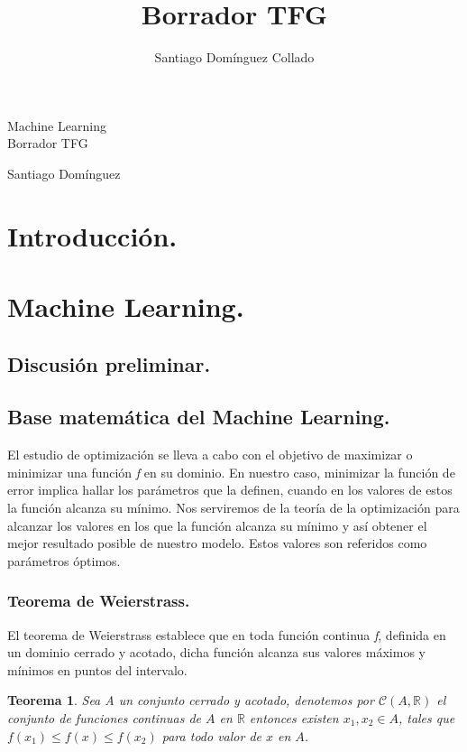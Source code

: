 \documentclass[a4paper,10pt]{article}
\author{Santiago Domínguez Collado}
\title{Borrador TFG}
\newtheorem{theorem}{Teorema}
\begin{document}
\begin{center}
\begin{LARGE}
Machine Learning \\
\vspace*{0.15in}
\UseRawInputEncoding
Borrador TFG
\end{LARGE}
\end{center}
\begin{center}
\begin{large}
Santiago Domínguez
\end{large}
\end{center}

\section{Introducción.}
\section{Machine Learning.}
\subsection{Discusión preliminar.}
\subsection{Base matemática del Machine Learning.}
\label{}

El estudio de optimización se lleva a cabo con el objetivo de maximizar o minimizar una función \textit{f} en su dominio.
En nuestro caso, minimizar la función de error implica hallar los parámetros que la definen, cuando en los valores de estos la función alcanza su mínimo.
Nos serviremos de la teoría de la optimización para alcanzar los valores en los que la función alcanza su mínimo y así obtener el mejor resultado posible de nuestro modelo. Estos valores son referidos como parámetros óptimos.
\subsubsection{Teorema de Weierstrass.}

El teorema de Weierstrass establece que en toda función continua \textit{f}, definida en un dominio cerrado y acotado, dicha función alcanza sus valores máximos y mínimos en puntos del intervalo.
\begin{theorem}
Sea A un conjunto cerrado y acotado, denotemos por $\mathcal{C}(A,\mathbb{R})$  el conjunto de funciones continuas de $A$ en $\mathbb{R}$ entonces existen $ x_{1},x_{2} \in A$, tales que $ f(x_{1}) \leq f(x) \leq f(x_{2})$ para todo valor de $x$ en $A$.
\end{theorem}
\end{document}
